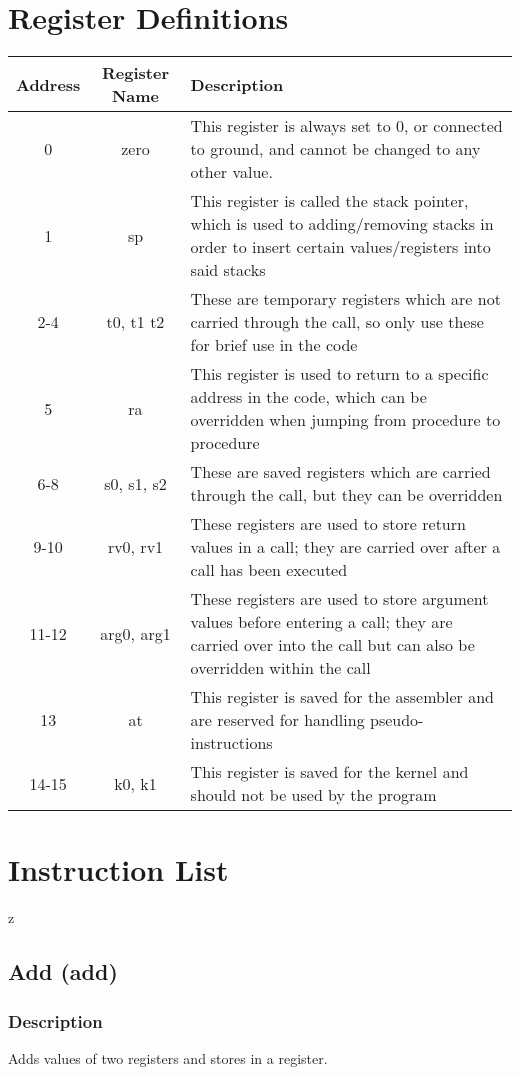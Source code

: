 \documentclass[12pt, a4paper]{report}
\begin{document}
	\section{Register Definitions}
	{\renewcommand{\arraystretch}{1.5}
		\begin{tabular}[c]{c|c| p{8cm}}
			Address & Register Name & Description \\
			\hline
			0 & zero & This register is always set to 0, or connected to ground, and cannot be changed to any other value. \\
			\hline
			1 & sp & This register is called the stack pointer, which is used to adding/removing stacks in order to insert certain values/registers into said stacks \\
			\hline
			2-4 & t0, t1 t2 & These are temporary registers which are not carried through the call, so only use these for brief use in the code \\
			\hline
			5 & ra & This register is used to return to a specific address in the code, which can be overridden when jumping from procedure to procedure \\
			\hline
			6-8 & s0, s1, s2 & These are saved registers which are carried through the call, but they can be overridden \\
			\hline
			9-10 & rv0, rv1 & These registers are used to store return values in a call; they are carried over after a call has been executed \\
			\hline
			11-12 & arg0, arg1 & These registers are used to store argument values before entering a call; they are carried over into the call but can also be overridden within the call \\
			\hline
			13 & at & This register is saved for the assembler and are reserved for handling pseudo-instructions \\
			\hline
			14-15 & k0, k1 & This register is saved for the kernel and should not be used by the program
		\end{tabular}
	}

	\section{Instruction List}
	\lstMakeShortInline[language={[MERC16]Assembler}]z
	
	\subsection{Add (add)}
	\subsubsection{Description}
	Adds values of two registers and stores in a register.
\end{document}
